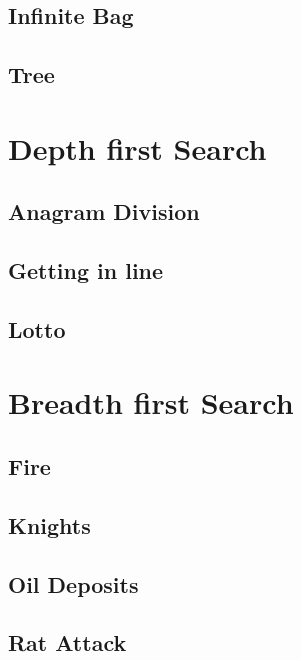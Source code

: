     \subsection{Infinite Bag}
        
    \subsection{Tree}
        

\section{Depth first Search}
    \subsection{Anagram Division}
            
    \subsection{Getting in line}
            
    \subsection{Lotto}
            

\section{Breadth first Search}
    \subsection{Fire}
            
    \subsection{Knights}
            
    \subsection{Oil Deposits}
            
    \subsection{Rat Attack}
            

